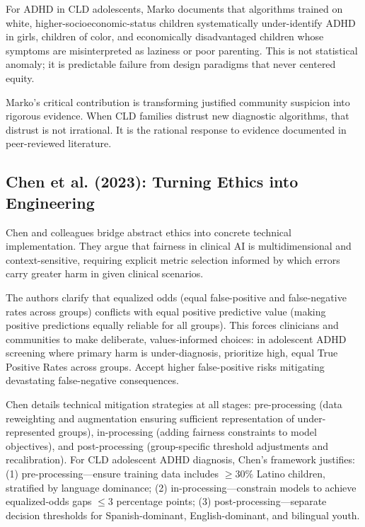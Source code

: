 \documentclass[12pt,a4paper]{article}
\begin{document}
For ADHD in CLD adolescents, Marko documents that algorithms trained on white, higher-socioeconomic-status children systematically under-identify ADHD in girls, children of color, and economically disadvantaged children whose symptoms are misinterpreted as laziness or poor parenting. This is not statistical anomaly; it is predictable failure from design paradigms that never centered equity.

Marko's critical contribution is transforming justified community suspicion into rigorous evidence. When CLD families distrust new diagnostic algorithms, that distrust is not irrational. It is the rational response to evidence documented in peer-reviewed literature.

\subsection{Chen et al. (2023): Turning Ethics into Engineering}

Chen and colleagues bridge abstract ethics into concrete technical implementation. They argue that fairness in clinical AI is multidimensional and context-sensitive, requiring explicit metric selection informed by which errors carry greater harm in given clinical scenarios.

The authors clarify that equalized odds (equal false-positive and false-negative rates across groups) conflicts with equal positive predictive value (making positive predictions equally reliable for all groups). This forces clinicians and communities to make deliberate, values-informed choices: in adolescent ADHD screening where primary harm is under-diagnosis, prioritize high, equal True Positive Rates across groups. Accept higher false-positive risks mitigating devastating false-negative consequences.

Chen details technical mitigation strategies at all stages: pre-processing (data reweighting and augmentation ensuring sufficient representation of under-represented groups), in-processing (adding fairness constraints to model objectives), and post-processing (group-specific threshold adjustments and recalibration). For CLD adolescent ADHD diagnosis, Chen's framework justifies: (1) pre-processing—ensure training data includes $\geq 30\%$ Latino children, stratified by language dominance; (2) in-processing—constrain models to achieve equalized-odds gaps $\leq 3$ percentage points; (3) post-processing—separate decision thresholds for Spanish-dominant, English-dominant, and bilingual youth.
\end{document}
